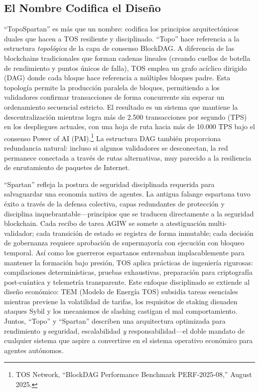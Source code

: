 \documentclass[11pt]{article}
\begin{document}
\subsection{El Nombre Codifica el Diseño}
``TopoSpartan'' es más que un nombre: codifica los principios arquitectónicos duales que hacen a TOS resiliente y disciplinado. ``Topo'' hace referencia a la estructura \emph{topológica} de la capa de consenso BlockDAG. A diferencia de las blockchains tradicionales que forman cadenas lineales (creando cuellos de botella de rendimiento y puntos únicos de falla), TOS emplea un grafo acíclico dirigido (DAG) donde cada bloque hace referencia a múltiples bloques padre. Esta topología permite la producción paralela de bloques, permitiendo a los validadores confirmar transacciones de forma concurrente sin esperar un ordenamiento secuencial estricto. El resultado es un sistema que mantiene la descentralización mientras logra más de 2.500 transacciones por segundo (TPS) en los despliegues actuales, con una hoja de ruta hacia más de 10.000 TPS bajo el consenso Power of AI (PAI).\footnote{TOS Network, ``BlockDAG Performance Benchmark PERF-2025-08,'' August 2025.} La estructura DAG también proporciona redundancia natural: incluso si algunos validadores se desconectan, la red permanece conectada a través de rutas alternativas, muy parecido a la resiliencia de enrutamiento de paquetes de Internet.

``Spartan'' refleja la postura de seguridad disciplinada requerida para salvaguardar una economía nativa de agentes. La antigua falange espartana tuvo éxito a través de la defensa colectiva, capas redundantes de protección y disciplina inquebrantable---principios que se traducen directamente a la seguridad blockchain. Cada recibo de tarea AGIW se somete a atestiguación multi-validador; cada transición de estado se registra de forma inmutable; cada decisión de gobernanza requiere aprobación de supermayoría con ejecución con bloqueo temporal. Así como los guerreros espartanos entrenaban implacablemente para mantener la formación bajo presión, TOS aplica prácticas de ingeniería rigurosas: compilaciones determinísticas, pruebas exhaustivas, preparación para criptografía post-cuántica y telemetría transparente. Este enfoque disciplinado se extiende al diseño económico: TEM (Modelo de Energía TOS) subsidia tareas esenciales mientras previene la volatilidad de tarifas, los requisitos de staking disuaden ataques Sybil y los mecanismos de slashing castigan el mal comportamiento. Juntos, ``Topo'' y ``Spartan'' describen una arquitectura optimizada para rendimiento \emph{y} seguridad, escalabilidad \emph{y} responsabilidad---el doble mandato de cualquier sistema que aspire a convertirse en el sistema operativo económico para agentes autónomos.
\end{document}
